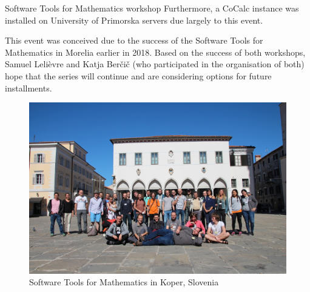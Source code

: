 \begin{event}{Software Tools for Mathematics workshop}
Furthermore, a CoCalc instance was installed on University of Primorska servers
due largely to this event.

This event was conceived due to the success of the Software Tools for Mathematics
in Morelia earlier in 2018.
Based on the success of both workshops,
Samuel Leli\`{e}vre and Katja Ber\v{c}i\v{c} (who participated in the organisation of both)
hope that the series will continue and are considering options for future installments.

\begin{figure}[ht]
  \includegraphics[width=.75\textwidth]{stm-koper2019.jpeg}
  \caption*{Software Tools for Mathematics in Koper, Slovenia}
\end{figure}



\end{event}

